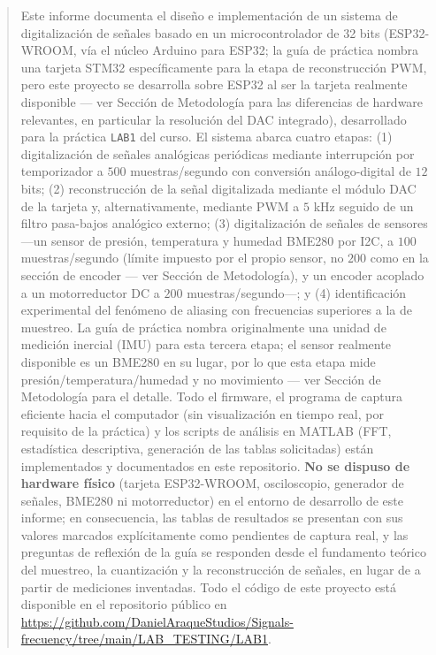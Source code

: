 
\begin{abstract}

Este informe documenta el diseño e implementación de un sistema de digitalización de señales basado en un microcontrolador de 32 bits (ESP32-WROOM, vía el núcleo Arduino para ESP32; la guía de práctica nombra una tarjeta STM32 específicamente para la etapa de reconstrucción PWM, pero este proyecto se desarrolla sobre ESP32 al ser la tarjeta realmente disponible — ver Sección de Metodología para las diferencias de hardware relevantes, en particular la resolución del DAC integrado), desarrollado para la práctica \texttt{LAB1} del curso. El sistema abarca cuatro etapas: (1) digitalización de señales analógicas periódicas mediante interrupción por temporizador a $500$ muestras/segundo con conversión análogo-digital de $12$ bits; (2) reconstrucción de la señal digitalizada mediante el módulo DAC de la tarjeta y, alternativamente, mediante PWM a $5$ kHz seguido de un filtro pasa-bajos analógico externo; (3) digitalización de señales de sensores —un sensor de presión, temperatura y humedad BME280 por I2C, a $100$ muestras/segundo (límite impuesto por el propio sensor, no $200$ como en la sección de encoder — ver Sección de Metodología), y un encoder acoplado a un motorreductor DC a $200$ muestras/segundo—; y (4) identificación experimental del fenómeno de aliasing con frecuencias superiores a la de muestreo. La guía de práctica nombra originalmente una unidad de medición inercial (IMU) para esta tercera etapa; el sensor realmente disponible es un BME280 en su lugar, por lo que esta etapa mide presión/temperatura/humedad y no movimiento — ver Sección de Metodología para el detalle. Todo el firmware, el programa de captura eficiente hacia el computador (sin visualización en tiempo real, por requisito de la práctica) y los scripts de análisis en MATLAB (FFT, estadística descriptiva, generación de las tablas solicitadas) están implementados y documentados en este repositorio. \textbf{No se dispuso de hardware físico} (tarjeta ESP32-WROOM, osciloscopio, generador de señales, BME280 ni motorreductor) en el entorno de desarrollo de este informe; en consecuencia, las tablas de resultados se presentan con sus valores marcados explícitamente como pendientes de captura real, y las preguntas de reflexión de la guía se responden desde el fundamento teórico del muestreo, la cuantización y la reconstrucción de señales, en lugar de a partir de mediciones inventadas. Todo el código de este proyecto está disponible en el repositorio público en \url{https://github.com/DanielAraqueStudios/Signals-frecuency/tree/main/LAB_TESTING/LAB1}.

\end{abstract}

